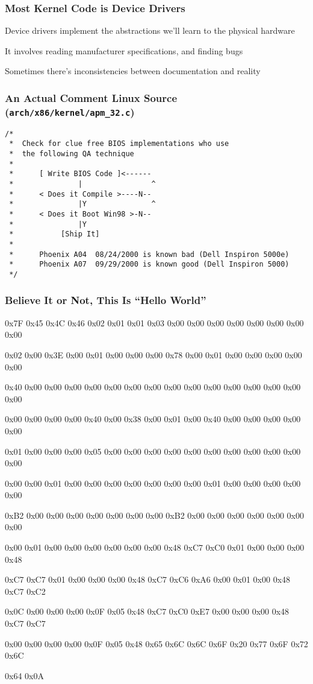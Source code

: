   \begin{frame}
    \frametitle{Most Kernel Code is Device Drivers}

    Device drivers implement the abstractions we'll learn to the physical hardware

    \vspace{2em}

    It involves reading manufacturer specifications, and finding bugs

    \vspace{2em}

    Sometimes there's inconsistencies between documentation and reality
  \end{frame}

  \begin{frame}[fragile]
    \frametitle{An Actual Comment Linux Source (\texttt{arch/x86/kernel/apm\_32.c})}
    \begin{lstlisting}
/*
 *  Check for clue free BIOS implementations who use
 *  the following QA technique
 *
 *      [ Write BIOS Code ]<------
 *               |                ^
 *      < Does it Compile >----N--
 *               |Y               ^
 *      < Does it Boot Win98 >-N--
 *               |Y
 *           [Ship It]
 *
 *      Phoenix A04  08/24/2000 is known bad (Dell Inspiron 5000e)
 *      Phoenix A07  09/29/2000 is known good (Dell Inspiron 5000)
 */
    \end{lstlisting}
  \end{frame}

  \begin{frame}
    \frametitle{Believe It or Not, This Is ``Hello World''}

    \scriptsize \ttfamily
    0x7F 0x45 0x4C 0x46 0x02 0x01 0x01 0x03 0x00 0x00 0x00 0x00 0x00 0x00 0x00
    0x00

    0x02 0x00 0x3E 0x00 0x01 0x00 0x00 0x00 0x78 0x00 0x01 0x00 0x00 0x00 0x00
    0x00

    0x40 0x00 0x00 0x00 0x00 0x00 0x00 0x00 0x00 0x00 0x00 0x00 0x00 0x00 0x00
    0x00

    0x00 0x00 0x00 0x00 0x40 0x00 0x38 0x00 0x01 0x00 0x40 0x00 0x00 0x00 0x00
    0x00

    0x01 0x00 0x00 0x00 0x05 0x00 0x00 0x00 0x00 0x00 0x00 0x00 0x00 0x00 0x00
    0x00

    0x00 0x00 0x01 0x00 0x00 0x00 0x00 0x00 0x00 0x00 0x01 0x00 0x00 0x00 0x00
    0x00

    0xB2 0x00 0x00 0x00 0x00 0x00 0x00 0x00 0xB2 0x00 0x00 0x00 0x00 0x00 0x00
    0x00

    0x00 0x01 0x00 0x00 0x00 0x00 0x00 0x00 0x48 0xC7 0xC0 0x01 0x00 0x00 0x00
    0x48

    0xC7 0xC7 0x01 0x00 0x00 0x00 0x48 0xC7 0xC6 0xA6 0x00 0x01 0x00 0x48 0xC7
    0xC2

    0x0C 0x00 0x00 0x00 0x0F 0x05 0x48 0xC7 0xC0 0xE7 0x00 0x00 0x00 0x48 0xC7
    0xC7

    0x00 0x00 0x00 0x00 0x0F 0x05 0x48 0x65 0x6C 0x6C 0x6F 0x20 0x77 0x6F 0x72
    0x6C

    0x64 0x0A
  \end{frame}

